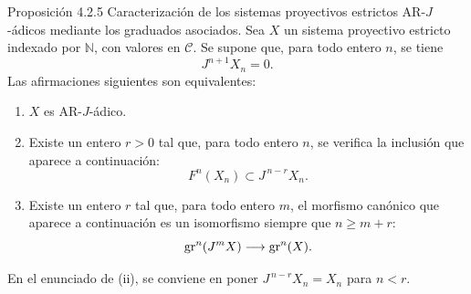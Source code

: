 \begin{statement}{Proposición 4.2.5}
Caracterización de los sistemas proyectivos estrictos AR-\(J\)-ádicos mediante los graduados asociados. Sea \(X\) un sistema proyectivo estricto indexado por \(\mathbb N\), con valores en \(\mathcal C\). Se supone que, para todo entero \(n\), se tiene
\[
J^{n+1}X_n=0.
\]
Las afirmaciones siguientes son equivalentes:
\begin{enumerate}[label=\textup{(\roman*)}]
\item \(X\) es AR-\(J\)-ádico.
\item Existe un entero \(r>0\) tal que, para todo entero \(n\), se verifica la inclusión que aparece a continuación:
\[
F^n(X_n)\subset J^{\,n-r}X_n.
\]
\item Existe un entero \(r\) tal que, para todo entero \(m\), el morfismo canónico que aparece a continuación es un isomorfismo siempre que \(n\ge m+r\):
\[
\operatorname{gr}^n(J^mX)\longrightarrow \operatorname{gr}^n(X).
\]
\end{enumerate}
En el enunciado de (ii), se conviene en poner \(J^{\,n-r}X_n=X_n\) para \(n<r\).
\end{statement}
